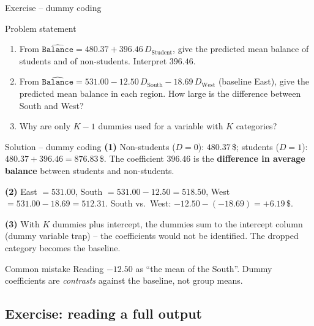 \documentclass[aspectratio=169,11pt]{beamer}
\begin{document}
\begin{frame}{Exercise -- dummy coding}
  \begin{block}{Problem statement}
    \begin{enumerate}
      \item From $\widehat{\texttt{Balance}}=480.37+396.46\,D_{\text{Student}}$,
            give the predicted mean balance of students and of non-students.
            Interpret $396.46$.
      \item From $\widehat{\texttt{Balance}}=531.00-12.50\,D_{\text{South}}-18.69\,D_{\text{West}}$
            (baseline East), give the predicted mean balance in each region.
            How large is the difference between South and West?
      \item Why are only $K-1$ dummies used for a variable with $K$
            categories?
    \end{enumerate}
  \end{block}
\end{frame}

\begin{frame}{Solution -- dummy coding}
  \textbf{(1)} Non-students ($D=0$): $480.37$\,\$; students ($D=1$):
  $480.37+396.46=876.83$\,\$. The coefficient $396.46$ is the
  \textbf{difference in average balance} between students and non-students.

  \medskip
  \textbf{(2)} East $=531.00$, South $=531.00-12.50=518.50$, West
  $=531.00-18.69=512.31$. South vs.\ West: $-12.50-(-18.69)=+6.19$\,\$.

  \medskip
  \textbf{(3)} With $K$ dummies plus intercept, the dummies sum to the
  intercept column (dummy variable trap) -- the coefficients would not be
  identified. The dropped category becomes the baseline.
  \begin{alertblock}{Common mistake}
    Reading $-12.50$ as ``the mean of the South''. Dummy coefficients are
    \emph{contrasts} against the baseline, not group means.
  \end{alertblock}
\end{frame}

\subsection{Exercise: reading a full output}
\end{document}
